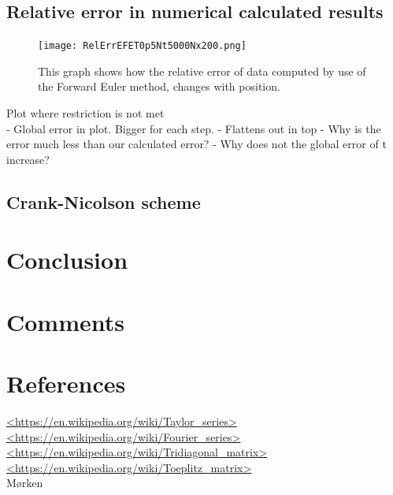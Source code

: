 \documentclass[12pt]{article}
\begin{document}
\begin{flushleft}
\newpage
\subsection{Relative error in numerical calculated results}
\begin{figure}[!h]
\begin{center}
\texttt{[image: RelErrEFET0p5Nt5000Nx200.png]}
\caption{\label{fig:forward_Euler_error}This graph shows how the relative error of data computed by use of the Forward Euler method, changes with position.}
\end{center}
\end{figure}

Plot where restriction is not met\\
- Global error in plot. Bigger for each step.
- Flattens out in top
- Why is the error much less than our calculated error?
- Why does not the global error of t increase?
\subsection{Crank-Nicolson scheme}

\section{Conclusion}

\section{Comments}

\section{References}
\url{<https://en.wikipedia.org/wiki/Taylor_series>}\\
\url{<https://en.wikipedia.org/wiki/Fourier_series>}\\
\url{<https://en.wikipedia.org/wiki/Tridiagonal_matrix>}\\
\url{<https://en.wikipedia.org/wiki/Toeplitz_matrix>}\\
Mørken

\end{flushleft}
\end{document}
